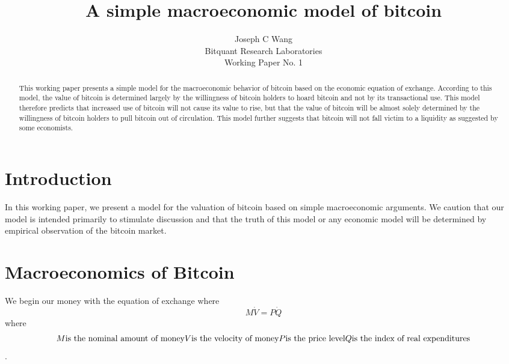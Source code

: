 \title{A simple macroeconomic model of bitcoin}
\author{Joseph C Wang\\
\small Bitquant Research Laboratories\\
\small Working Paper No. 1}

\maketitle
\begin{abstract}
This working paper presents a simple model for the macroeconomic
behavior of bitcoin based on the economic equation of exchange.
According to this model, the value of bitcoin is determined largely by
the willingness of bitcoin holders to hoard bitcoin and not by its
transactional use.  This model therefore predicts that increased use
of bitcoin will not cause its value to rise, but that the value of
bitcoin will be almost solely determined by the willingness of bitcoin
holders to pull bitcoin out of circulation.  This model further
suggests that bitcoin will not fall victim to a liquidity as suggested
by some economists.
\end{abstract}

\section{Introduction} 

In this working paper, we present a model for the valuation of bitcoin
based on simple macroeconomic arguments.  We caution that our model is
intended primarily to stimulate discussion and that the truth of this
model or any economic model will be determined by empirical
observation of the bitcoin market.

\section{Macroeconomics of Bitcoin}

We begin our money with the equation of exchange where
\begin{equation}
M \dot V = P \dot Q
\end{equation}
where
$$
M \mbox{is the nominal amount of money}\\
V \mbox{is the velocity of money}\\
P \mbox{is the price level}\\
Q \mbox{is the index of real expenditures}\\
$$.

